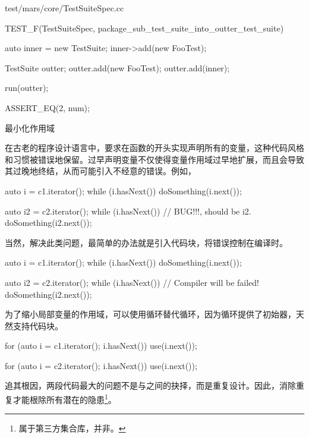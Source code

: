 \begin{content}
\begin{nodiff}{test/mars/core/TestSuiteSpec.cc}
\begin{c++}
TEST_F(TestSuiteSpec, package_sub_test_suite_into_outter_test_suite) {
  auto inner = new TestSuite;
  inner->add(new FooTest);

  TestSuite outter;
  outter.add(new FooTest);
  outter.add(inner);

  run(outter);

  ASSERT_EQ(2, num);
} 
\end{c++}
\end{nodiff}

\begin{episode}{最小化作用域}

\begin{content}

在古老的程序设计语言中，要求在函数的开头实现声明所有的变量，这种代码风格和习惯被错误地保留。过早声明变量不仅使得变量作用域过早地扩展，而且会导致其过晚地终结，从而可能引入不经意的错误。例如，

 \begin{c++}[title={\ttfamily{while循环}}]
auto i = c1.iterator();
while (i.hasNext()) {
  doSomething(i.next());
}

auto i2 = c2.iterator();
while (i.hasNext()) {           // BUG!!!, should be i2.
  doSomething(i2.next());
}
 \end{c++}

当然，解决此类问题，最简单的办法就是引入代码块，将错误控制在编译时。

 \begin{c++}[title={\ttfamily{while循环}}]
{
  auto i = c1.iterator();
  while (i.hasNext()) {
    doSomething(i.next());
  }
}

{
  auto i2 = c2.iterator();
  while (i.hasNext()) {           // Compiler will be failed!
    doSomething(i2.next());
  }
}
 \end{c++}

为了缩小局部变量的作用域，可以使用循环替代循环，因为循环提供了初始器，天然支持代码块。

 \begin{c++}[title={\ttfamily{for循环}}]
for (auto i = c1.iterator(); i.hasNext()) {
  use(i.next());
}

for (auto i = c2.iterator(); i.hasNext()) {
  use(i.next());
}
 \end{c++}

追其根因，两段代码最大的问题不是与之间的抉择，而是重复设计。因此，消除重复才能根除所有潜在的隐患\footnote{属于第三方集合库，并非。}。


\end{content}
\end{episode}
\end{content}
